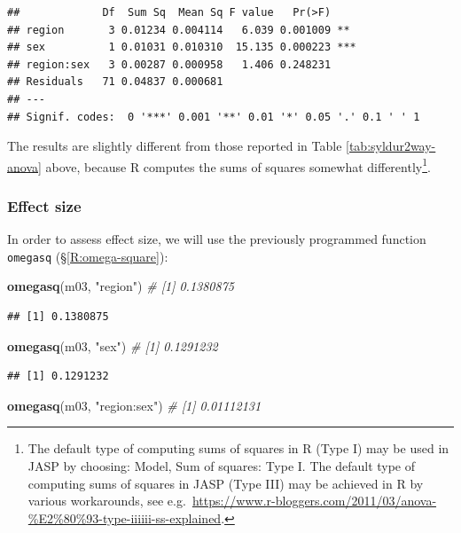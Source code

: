 \documentclass[
]{book}
\newenvironment{Shaded}{\begin{snugshade}}{\end{snugshade}}
\newcommand{\CommentTok}[1]{\textcolor[rgb]{0.56,0.35,0.01}{\textit{#1}}}
\newcommand{\KeywordTok}[1]{\textcolor[rgb]{0.13,0.29,0.53}{\textbf{#1}}}
\newcommand{\NormalTok}[1]{#1}
\newcommand{\StringTok}[1]{\textcolor[rgb]{0.31,0.60,0.02}{#1}}
\begin{document}
\begin{verbatim}
##             Df  Sum Sq  Mean Sq F value   Pr(>F)    
## region       3 0.01234 0.004114   6.039 0.001009 ** 
## sex          1 0.01031 0.010310  15.135 0.000223 ***
## region:sex   3 0.00287 0.000958   1.406 0.248231    
## Residuals   71 0.04837 0.000681                     
## ---
## Signif. codes:  0 '***' 0.001 '**' 0.01 '*' 0.05 '.' 0.1 ' ' 1
\end{verbatim}

The results are slightly different from those reported in Table \ref{tab:syldur2way-anova} above, because R computes the sums of squares somewhat differently\footnote{The default type of computing sums of squares in R (Type I) may be used in JASP by choosing: Model, Sum of squares: Type I. The default type of computing sums of squares in JASP (Type III) may be achieved in R by various workarounds, see e.g.~\url{https://www.r-bloggers.com/2011/03/anova-\%E2\%80\%93-type-iiiiii-ss-explained}.}.

\hypertarget{effectsize}{%
\subsubsection{Effect size}\label{effectsize}}

In order to assess effect size, we will use the previously programmed function \texttt{omegasq}
(§\ref{R:omega-square}):

\begin{Shaded}
\begin{Highlighting}[]
\KeywordTok{omegasq}\NormalTok{(m03, }\StringTok{"region"}\NormalTok{)      }\CommentTok{\# [1] 0.1380875}
\end{Highlighting}
\end{Shaded}

\begin{verbatim}
## [1] 0.1380875
\end{verbatim}

\begin{Shaded}
\begin{Highlighting}[]
\KeywordTok{omegasq}\NormalTok{(m03, }\StringTok{"sex"}\NormalTok{)         }\CommentTok{\# [1] 0.1291232}
\end{Highlighting}
\end{Shaded}

\begin{verbatim}
## [1] 0.1291232
\end{verbatim}

\begin{Shaded}
\begin{Highlighting}[]
\KeywordTok{omegasq}\NormalTok{(m03, }\StringTok{"region:sex"}\NormalTok{)  }\CommentTok{\# [1] 0.01112131}
\end{Highlighting}
\end{Shaded}
\end{document}
